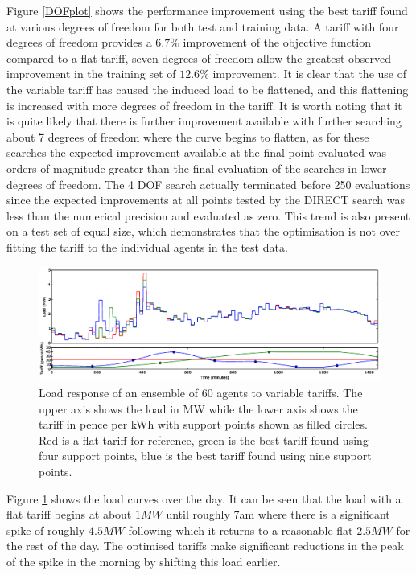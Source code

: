 \documentclass[a4paper, 10 pt, conference]{ieeeconf}  %
\begin{document}
Figure \ref{DOFplot} shows the performance improvement using the best tariff found at various degrees of freedom for both test and training data. A tariff with four degrees of freedom provides a $6.7\%$ improvement of the objective function compared to a flat tariff, seven degrees of freedom allow the greatest observed improvement in the training set of $12.6\%$ improvement. It is clear that the use of the variable tariff has caused the induced load to be flattened, and this flattening is increased with more degrees of freedom in the tariff. It is worth noting that it is quite likely that there is further improvement available with further searching about 7 degrees of freedom where the curve begins to flatten, as for these searches the expected improvement available at the final point evaluated was orders of magnitude greater than the final evaluation of the searches in lower degrees of freedom. The 4 DOF search actually terminated before 250 evaluations since the expected improvements at all points tested by the DIRECT search was less than the numerical precision and evaluated as zero. This trend is also present on a test set of equal size, which demonstrates that the optimisation is not over fitting the tariff to the individual agents in the test data. 

\begin{figure}[htb]

\centering
\includegraphics[width=\textwidth,trim =4cm 12cm 4cm 2cm,clip=True]{f1.eps}
\caption{Load response of an ensemble of 60 agents to variable tariffs. The upper axis shows the load in MW while the lower axis shows the tariff in pence per kWh with support points shown as filled circles. Red is a flat tariff for reference, green is the best tariff found using four support points, blue is the best tariff found using nine support points.}
\label{loadcurve2}
\end{figure}

Figure \ref{loadcurve2} shows the load curves over the day. It can be seen that the load with a flat tariff begins at about $1MW$ until roughly 7am where there is a significant spike of roughly $4.5MW$ following which it returns to a reasonable flat $2.5MW$ for the rest of the day. The optimised tariffs make significant reductions in the peak of the spike in the morning  by shifting this load earlier.
\end{document}

